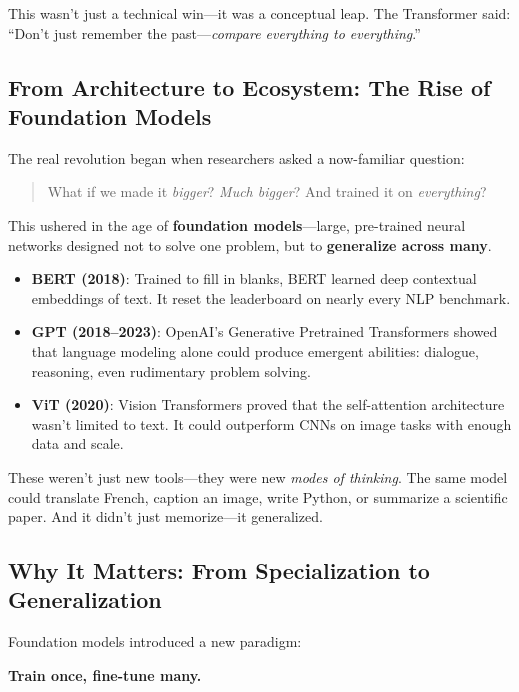 This wasn’t just a technical win—it was a conceptual leap. The Transformer said: “Don’t just remember the past—\emph{compare everything to everything}.”

\subsection{From Architecture to Ecosystem: The Rise of Foundation Models}

The real revolution began when researchers asked a now-familiar question:  
\begin{quote}
What if we made it \emph{bigger}?  
\emph{Much bigger}?  
And trained it on \emph{everything}?  
\end{quote}

This ushered in the age of \textbf{foundation models}—large, pre-trained neural networks designed not to solve one problem, but to \textbf{generalize across many}.

\begin{itemize}
  \item \textbf{BERT (2018)}: Trained to fill in blanks, BERT learned deep contextual embeddings of text. It reset the leaderboard on nearly every NLP benchmark.
  
  \item \textbf{GPT (2018–2023)}: OpenAI’s Generative Pretrained Transformers showed that language modeling alone could produce emergent abilities: dialogue, reasoning, even rudimentary problem solving.
  
  \item \textbf{ViT (2020)}: Vision Transformers proved that the self-attention architecture wasn’t limited to text. It could outperform CNNs on image tasks with enough data and scale.
\end{itemize}

These weren’t just new tools—they were new \emph{modes of thinking}. The same model could translate French, caption an image, write Python, or summarize a scientific paper. And it didn’t just memorize—it generalized.

\subsection{Why It Matters: From Specialization to Generalization}

Foundation models introduced a new paradigm:
\begin{center}
\textbf{Train once, fine-tune many.}
\end{center}

